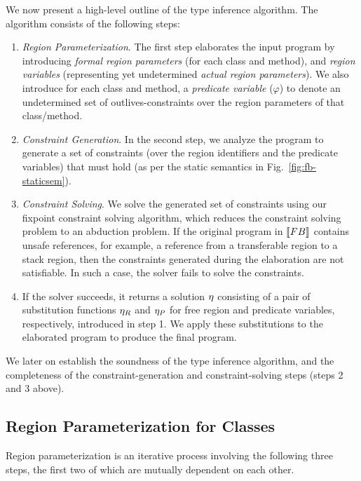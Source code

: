 \documentclass[a4paper,UKenglish]{lipics-v2018}
\newcommand{\thesemof}[1]{ \llbracket #1 \rrbracket}
\newcommand{\absof}[1]{\thesemof{#1}}
\newcommand{\FB}{{\sc FB}\xspace}
\begin{document}
We now present a high-level outline of the type inference algorithm.
The algorithm consists of the following steps:
\begin{enumerate}
 \item \emph{Region Parameterization}.
   The first step elaborates the input program by introducing \emph{formal region parameters}
   (for each class and method), and \emph{region variables} (representing yet undetermined
   \emph{actual region parameters}). We also introduce for each class and method, a
   \emph{predicate variable} ($\varphi$) to denote an undetermined set of outlives-constraints
   over the region parameters of that class/method.

 \item \emph{Constraint Generation}.
   In the second step, we analyze the program to generate a set of constraints
   (over the region identifiers and the predicate variables)
   that must hold (as per the static semantics in Fig.~\ref{fig:fb-staticsem}).

 \item \emph{Constraint Solving}.
   We solve the generated set of constraints using our fixpoint constraint
   solving algorithm, which reduces the constraint solving problem to
   an abduction problem. If the original program in $\absof{\FB}$ contains unsafe
   references, for example, a reference from a transferable region to a
   stack region, then the constraints generated during the elaboration
   are not satisfiable. In such a case, the solver fails to solve
   the constraints.

 \item If the solver succeeds, it returns a solution $\eta$ consisting of a
   pair of substitution functions $\eta_R$ and $\eta_P$ for
   free region and predicate variables, respectively, introduced in step 1.
   We apply these substitutions to the elaborated program to produce the final program.
\end{enumerate}

We later on establish the soundness of the type inference algorithm,
and the completeness of the constraint-generation and
constraint-solving steps (steps 2 and 3 above).

\subsection{Region Parameterization for Classes}
\label{sec:fb-templatization}

Region parameterization is an iterative process involving the
following three steps, the first two of which are mutually dependent
on each other.
\end{document}
